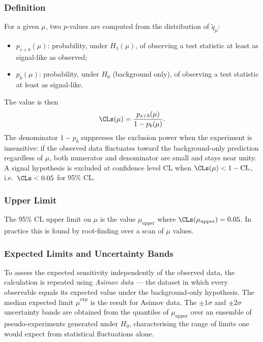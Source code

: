 \subsubsection{\CLs{} Definition}

For a given $\mu$, two $p$-values are computed from the distribution of
$\tilde{q}_\mu$:
%
\begin{itemize}
  \item $p_{s+b}(\mu)$: probability, under $H_1(\mu)$, of observing a test
    statistic at least as signal-like as observed;
  \item $p_b(\mu)$: probability, under $H_0$ (background only), of observing
    a test statistic at least as signal-like.
\end{itemize}
%
The \CLs{} value is then
%
\begin{equation}
  \CLs(\mu) = \frac{p_{s+b}(\mu)}{1 - p_b(\mu)}.
\end{equation}
%
The denominator $1-p_b$ suppresses the exclusion power when the experiment is
insensitive: if the observed data fluctuates toward the background-only
prediction regardless of $\mu$, both numerator and denominator are small and
\CLs{} stays near unity.  A signal hypothesis is excluded at confidence level
CL when $\CLs(\mu) < 1 - \mathrm{CL}$, i.e.\ $\CLs < 0.05$ for 95\% CL.

\subsubsection{Upper Limit}

The 95\% CL upper limit on $\mu$ is the value $\mu_\text{upper}$ where
$\CLs(\mu_\text{upper}) = 0.05$.  In practice this is found by root-finding
over a scan of $\mu$ values.

\subsubsection{Expected Limits and Uncertainty Bands}

To assess the expected sensitivity independently of the observed data, the
calculation is repeated using \emph{Asimov data} — the dataset in which every
observable equals its expected value under the background-only hypothesis.
The median expected limit $\hat{\mu}^\text{exp}$ is the result for Asimov
data.  The $\pm1\sigma$ and $\pm2\sigma$ uncertainty bands are obtained from
the quantiles of $\mu_\text{upper}$ over an ensemble of pseudo-experiments
generated under $H_0$, characterising the range of limits one would expect
from statistical fluctuations alone.

